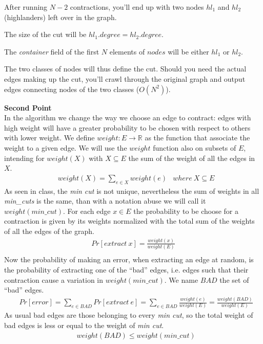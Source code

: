 \documentclass[a4paper]{article}
\begin{document}
After running $N-2$ contractions, you'll end up with two nodes $hl_1$ and $hl_2$ (highlanders) left over in the graph.

The size of the cut will be $hl_1.degree = hl_2.degree$.

The \emph{container} field of the first $N$ elements of $nodes$ will be either $hl_1$ or $hl_2$. 

The two classes of nodes will thus define the cut. Should you need the actual edges making up the cut, you'll crawl through the original graph and output edges connecting nodes of the two classes ($O(N^2)$).

\break
\noindent
\textbf{Second Point}
\\

In the algorithm we change the way we choose an edge to contract: edges with high weight will have a greater probability to be chosen with respect to others with lower weight.
We define $weight: E \longrightarrow \mathbb{R}$ as the function that associate the weight to a given edge.
We will use the $weight$ function also on subsets of $E$, intending for $weight(X)$ with $X \subseteq E$ the sum of the weight of all the edges in $X$.
\begin{align*}
&weight(X) = \sum_{e \in X} weight(e) &where\ X \subseteq E
\end{align*}
As seen in class, the \textit{min cut} is not unique, nevertheless the sum of weights in all \textit{min\_cuts} is the same, than with a notation abuse we will call it $weight(min\_cut)$.
For each edge $x \in E$ the probability to be choose for a contraction is given by its weights normalized with the total sum of the weights of all the edges of the graph.
\begin{align*}
Pr[extract\ x] = \frac{weight(x)}{weight(E)}\\
\end{align*}
Now the probability of making an error, when extracting an edge at random, is the probability of extracting one of the ``bad'' edges, i.e. edges such that their contraction cause a variation in $weight(min\_cut)$.
We name $BAD$ the set of ``bad'' edges.
\begin{align*}
&Pr[error] = \sum_{e \in BAD} Pr[extract\ e] = \sum_{e \in BAD} \frac{weight(e)}{weight(E)} = \frac{weight(BAD)}{weight(E)} \tag{1}
\end{align*}
As usual bad edges are those belonging to every \textit{min cut}, so the total weight of bad edges is less or equal to the weight of \textit{min cut}.
\begin{align*}
&weight(BAD) \leq {weight(min\_cut)} \tag{2}
\end{align*}
\end{document}
